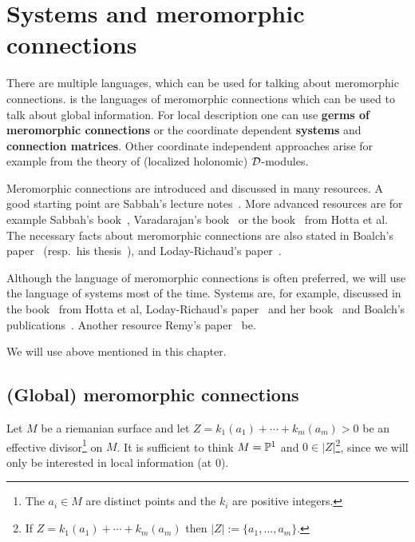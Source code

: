 \chapter{Systems and meromorphic connections}
There are multiple languages, which can be used for talking about meromorphic
connections.
 is the languages of meromorphic connections which
can be used to talk about global information.
For local description one can use \textbf{germs of meromorphic connections} or
the coordinate dependent \textbf{systems} and \textbf{connection matrices}.
Other coordinate independent approaches arise for example from the theory of
(localized holonomic) $\cD$-modules.

Meromorphic connections are introduced and discussed in many resources.
A good starting point are Sabbah's lecture notes~\cite{sabbah_cimpa90}.
More advanced resources are for example
Sabbah's book~\cite{sabbah2007isomonodromic},
Varadarajan's book~\cite{Varadarajan96linearmeromorphic} or the
book~\cite{hotta2008} from Hotta et al.
The necessary facts about meromorphic connections are also stated in
Boalch's paper~\cite{boalch} (resp.\ his thesis~\cite{thboalch}),
and Loday-Richaud's paper~\cite{Loday1994}.

Although the language of meromorphic connections is often preferred, we will
use the language of systems most of the time.
Systems are, for example, discussed in the book~\cite{hotta2008} from Hotta et
al, Loday-Richaud's paper~\cite{Loday1994} and her book~\cite{Loday2014} and
Boalch's publications~\cite{boalch,thboalch}. Another resource 
Remy's paper~\cite{Remy2014} be.

We will use  above mentioned  in this
chapter.

\section{(Global) meromorphic connections}
Let $M$ be a riemanian surface and let $Z=k_1(a_1)+\cdots+k_m(a_m)>0$ be an
effective divisor\footnote{The $a_i\in M$ are distinct points and the $k_i$ are
positive integers.} on $M$.
It is sufficient to think $M=\P^1$ and $0\in|Z|$\footnote{If
$Z=k_1(a_1)+\cdots+k_m(a_m)$ then $|Z|:=\{a_1,\dots,a_m\}$.}, since we will
only be interested in local information (at $0$).

